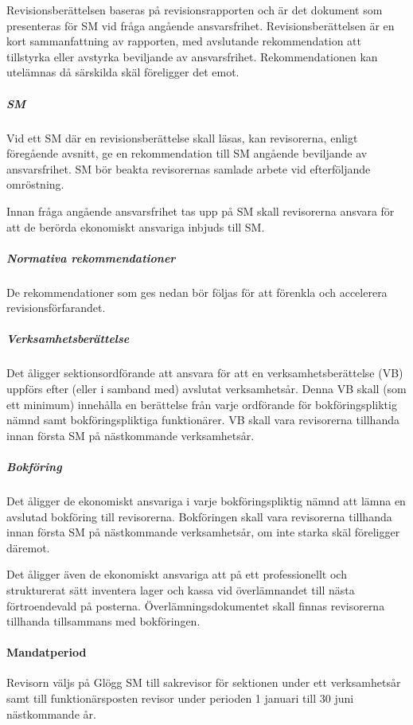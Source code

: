 \documentclass{dgovdoc}
\begin{document}
Revisionsberättelsen baseras på revisionsrapporten och är det dokument som
presenteras för SM vid fråga angående ansvarsfrihet. Revisionsberättelsen är en
kort sammanfattning av rapporten, med avslutande rekommendation att tillstyrka
eller avstyrka beviljande av ansvarsfrihet. Rekommendationen kan utelämnas då
särskilda skäl föreligger det emot.

\subparagraph{SM}

Vid ett SM där en revisionsberättelse skall läsas, kan revisorerna, enligt
föregående avsnitt, ge en rekommendation till SM angående beviljande av
ansvarsfrihet. SM bör beakta revisorernas samlade arbete vid efterföljande
omröstning.

Innan fråga angående ansvarsfrihet tas upp på SM skall revisorerna ansvara för
att de berörda ekonomiskt ansvariga inbjuds till SM.

\subparagraph{Normativa rekommendationer}

De rekommendationer som ges nedan bör följas för att förenkla och accelerera
revisionsförfarandet.

\subparagraph{Verksamhetsberättelse}

Det åligger sektionsordförande att ansvara för att en verksamhetsberättelse
(VB) uppförs efter (eller i samband med) avslutat verksamhetsår. Denna VB skall
(som ett minimum) innehålla en berättelse från varje ordförande för
bokföringspliktig nämnd samt bokföringspliktiga funktionärer. VB skall vara
revisorerna tillhanda innan första SM på nästkommande verksamhetsår.

\subparagraph{Bokföring}

Det åligger de ekonomiskt ansvariga i varje bokföringspliktig nämnd att lämna
en avslutad bokföring till revisorerna. Bokföringen skall vara revisorerna
tillhanda innan första SM på nästkommande verksamhetsår, om inte starka skäl
föreligger däremot.

Det åligger även de ekonomiskt ansvariga att på ett professionellt och
strukturerat sätt inventera lager och kassa vid överlämnandet till nästa
förtroendevald på posterna. Överlämningsdokumentet skall finnas revisorerna
tillhanda tillsammans med bokföringen.

\paragraph{Mandatperiod}

Revisorn väljs på Glögg SM till sakrevisor för sektionen under ett
verksamhetsår samt till funktionärsposten revisor under perioden 1 januari till
30 juni nästkommande år.
\end{document}
